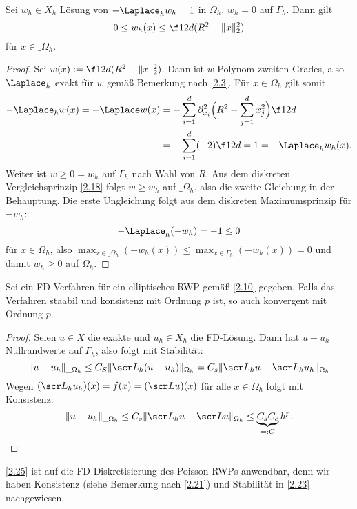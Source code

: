 \begin{lem} \label{2.24}
	Sei $w_h \in X_h$ Lösung von $-\Laplace_h w_h = 1$ in $\Omega_h$, $w_h = 0$ auf $\Gamma_h$.
	Dann gilt
	\begin{equation} \setcounter{equation}{6} \label{eq:2.6}
		0 \le w_h(x) \le \f 1{2d} (R^2 - \|x\|_2^2)
	\end{equation}
	für $x \in \_\Omega_h$.
	\begin{proof}
		Sei $w(x) := \f 1{2d} (R^2 - \|x\|_2^2)$.
		Dann ist $w$ Polynom zweiten Grades, also $\Laplace_h$ exakt für $w$ gemäß Bemerkung nach \ref{2.3}.
		Für $x \in \Omega_h$ gilt somit
		\begin{align*}
			-\Laplace_h w(x)
			= - \Laplace w(x)
			&= - \sum_{i=1}^d \partial_{x_i}^2 \Big(R^2 - \sum_{j=1}^d x_j^2 \Big) \f 1{2d} \\
			&= - \sum_{i=1}^d (-2) \f 1{2d}
			= 1
			= - \Laplace_h w_h(x).
		\end{align*}
		Weiter ist $w \ge 0 = w_h$ auf $\Gamma_h$ nach Wahl von $R$.
		Aus dem diskreten Vergleichsprinzip \ref{2.18} folgt $w \ge w_h$ auf $\_\Omega_h$, also die zweite Gleichung in der Behauptung.
		Die erste Ungleichung folgt aus dem diskreten Maximumsprinzip für $-w_h$:
		\[
			- \Laplace_h (-w_h) =  -1 \le 0
		\]
		für $x \in \Omega_h$, also $\max_{x\in\_\Omega_h} (-w_h(x)) \le \max_{x\in \Gamma_h} (-w_h(x)) = 0$ und damit $w_h \ge 0$ auf $\Omega_h$.
	\end{proof}
\end{lem}


\begin{st}[Konvergenz] \label{2.25}
	Sei ein FD-Verfahren für ein elliptisches RWP gemäß \ref{2.10} gegeben.
	Falls das Verfahren staabil und konsistenz mit Ordnung $p$ ist, so auch konvergent mit Ordnung $p$.
	\begin{proof}
		Seien $u \in X$ die exakte und $u_h \in X_h$ die FD-Lösung.
		Dann hat $u - u_h$ Nullrandwerte auf $\Gamma_h$, also folgt mit Stabilität:
		\[
			\|u-u_h\|_{\_\Omega_h}
			\le C_S \| \scr L_h (u-u_h) \|_{\Omega_h}
			= C_s \|\scr L_h u - \scr L_h u_h\|_{\Omega_h}
		\]
		Wegen $(\scr L_h u_h)(x) = f(x) = (\scr L u)(x)$ für alle $x \in \Omega_h$ folgt mit Konsistenz:
		\[
			\|u - u_h\|_{\_\Omega_h}
			\le C_s \|\scr L_h u - \scr L u\|_{\Omega_h}
			\le \underbrace{C_s C_c}_{=:C} h^p.
		\]
	\end{proof}
\end{st}

\ref{2.25} ist auf die FD-Diskretisierung des Poisson-RWPs anwendbar, denn wir haben Konsistenz (siehe Bemerkung nach \ref{2.21}) und Stabilität in \ref{2.23} nachgewiesen.

